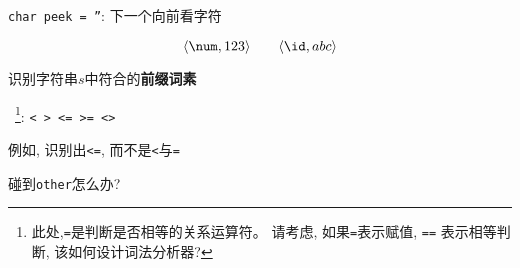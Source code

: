 \begin{frame}{}
  \begin{center}

    \pause
    \texttt{char peek = ''}: 下一个向前看字符

    \pause
    \vspace{0.60cm}

    \pause
    \vspace{-0.50cm}
    \[ 
      \langle \num, 123 \rangle \qquad \langle \id, abc \rangle
    \]
  \end{center}
\end{frame}

\begin{frame}{}
  \begin{center}
    识别字符串$s$中符合的{\bf 前缀词素}

    \vspace{0.30cm}
    \relop~\footnote{此处,\texttt{=}是判断是否相等的关系运算符。
    请考虑, 如果\texttt{=}表示赋值, \texttt{==} 表示相等判断, 该如何设计词法分析器?}: 
    \texttt{< \quad > \quad <= \quad >= \quad \red{=} \quad <>}

    \pause
    \vspace{0.30cm}

    \pause
     例如, 识别出\texttt{<=}, 而不是\texttt{<}与\texttt{=}

    \pause
     碰到\texttt{other}怎么办?
  \end{center}
\end{frame}

